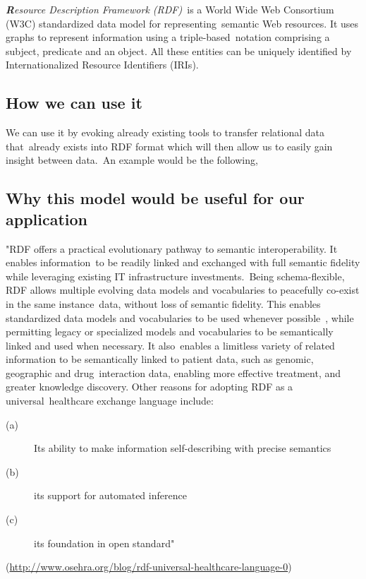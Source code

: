 \documentclass[DIV=calc, paper=a4, fontsize=12pt, onecolumn]{scrartcl}	 %
\newcommand{\initial}[1]{ %
\lettrine[lines=3,lhang=0.3,nindent=0em,slope=0em]{
\color{DarkBlue}
{\textbf{\textit{#1}}}}{}}
\begin{document}
\initial{R}\textit{esource Description Framework (RDF)}\
is a World Wide Web Consortium (W3C) standardized data model for representing\
semantic Web resources. It uses graphs to represent information using a triple-based\
 notation comprising a subject, predicate and an object. All these entities can be uniquely identified by Internationalized Resource Identifiers (IRIs).\
  \cite{pathak_applying_2012}

\subsection{How we can use it}

We can use it by evoking already existing tools to transfer relational data that\
already exists into RDF format which will then allow us to easily gain insight between data.\
An example would be the following,

\subsection{Why this model would be useful for our application}

"RDF offers a practical evolutionary pathway to semantic interoperability. It enables information\
 to be readily linked and exchanged with full semantic fidelity while leveraging existing IT infrastructure investments.\
 Being schema-flexible, RDF allows multiple evolving data models and vocabularies to peacefully co-exist in the same instance\
data, without loss of semantic fidelity. This enables standardized data models and vocabularies to be used whenever possible\
, while permitting legacy or specialized models and vocabularies to be semantically linked and used when necessary. It also\
 enables a limitless variety of related information to be semantically linked to patient data, such as genomic, geographic and drug\
 interaction data, enabling more effective treatment, and greater knowledge discovery. Other reasons for adopting RDF as a universal\
 healthcare exchange language include:

\begin{description}
\item[(a)]  Its ability to make information self-describing with precise semantics
\item[(b)] its support for automated inference
\item[(c)]  its foundation in open standard"
\end{description}

 (\url{http://www.osehra.org/blog/rdf-universal-healthcare-language-0})\\
\end{document}
